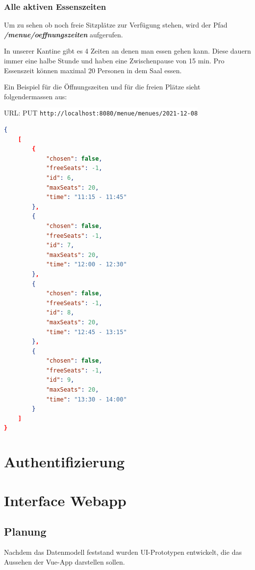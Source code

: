 \subsubsection{Alle aktiven Essenszeiten}

Um zu sehen ob noch freie Sitzplätze zur Verfügung stehen, wird der Pfad \textbf{\textit{/menue/oeffnungszeiten}} aufgerufen. 

In unserer Kantine gibt es 4 Zeiten an denen man essen gehen kann. Diese dauern immer eine halbe Stunde und haben eine Zwischenpause von 15 min. 
Pro Essenszeit können maximal 20 Personen in dem Saal essen.

Ein Beispiel für die Öffnungszeiten und für die freien Plätze sieht folgendermassen aus:

URL: PUT \colorbox{white}{\lstinline[basicstyle=\ttfamily\color{black},language=html]|http://localhost:8080/menue/menues/2021-12-08|}


\begin{lstlisting}[language=json,firstnumber=1]
{
    [
        {
            "chosen": false,
            "freeSeats": -1,
            "id": 6,
            "maxSeats": 20,
            "time": "11:15 - 11:45"
        },
        {
            "chosen": false,
            "freeSeats": -1,
            "id": 7,
            "maxSeats": 20,
            "time": "12:00 - 12:30"
        },
        {
            "chosen": false,
            "freeSeats": -1,
            "id": 8,
            "maxSeats": 20,
            "time": "12:45 - 13:15"
        },
        {
            "chosen": false,
            "freeSeats": -1,
            "id": 9,
            "maxSeats": 20,
            "time": "13:30 - 14:00"
        }
    ]
}
\end{lstlisting}

\section{Authentifizierung}

\section {Interface Webapp}
\author{Benjamin Besic}
\subsection{Planung}

Nachdem das Datenmodell feststand wurden UI-Prototypen entwickelt, die das Aussehen der Vue-App darstellen sollen.

